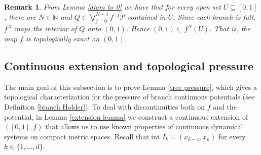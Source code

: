 \documentclass[10pt,a4paper]{amsart}
\numberwithin{equation}{section} %
\numberwithin{figure}{section} %
\newtheorem{rema}[prop]{Remark}
\newcommand{\N}{\mathbb{N}}
\renewcommand{\=}{\coloneqq}
\begin{document}
    \begin{rema}\label{rema topologically exact}
        From Lemma \ref{diam to 0} we have that for every open set $U\subseteq [0,1]$, there are $N\in\N$ and $Q\in \bigvee_{{j=0}}^{N-1} f^{-j}\mathcal{P}$ contained in $U$. Since each branch is full, $f^N$ maps the interior of $Q$ onto $(0, 1)$. Hence $(0,1) \subseteq f^N(U)$. That is, the map $f$ is topologically exact on $(0,1)$.
    \end{rema}

\subsection{Continuous extension and topological pressure}\label{subseq: continuous extension}
The main goal of this subsection is to prove Lemma \ref{tree pressure}, which gives a topological characterization for the pressure of branch continuous potentials (see Definition \ref{branch Holder}). To deal with discontinuities both on $f$ and the potential, in Lemma \ref{extension lemma} we construct a continuous extension of $([0,1],f)$ that allows us to use known properties of continuous dynamical systems on compact metric spaces.
 Recall that $\text{int } I_k = (x_{k-1},x_k)$ for every $k\in\{1,\ldots,d\}$.
\end{document}
